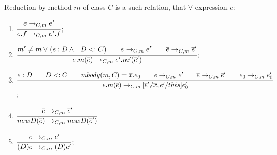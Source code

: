\documentclass[a4paper,12pt, titlepage]{article}
\newenvironment{definition}[1][Definition]{\begin{trivlist}
\item[\hskip \labelsep {\bfseries #1}]}{\end{trivlist}}
\begin{document}
\begin{definition}
Reduction by method $m$ of class $C$ is a such relation, that $\forall$ expression $e$:
\begin{enumerate}
\item $\cfrac{e \rightarrow_{C, m} e'}{e.f \rightarrow_{C, m} e'.f}$;
\item $\cfrac{m' \ne m \lor (e : D \land \lnot D <: C) \qquad e \rightarrow_{C, m} e' \qquad \overline{e} \rightarrow_{C, m} \overline{e}'}
{e.m(\overline{e}) \rightarrow_{C, m} e'.m'(\overline{e}')}$;
\item $\cfrac{e : D \qquad D <: C \qquad mbody(m, C) = \overline{x}.e_0 \qquad e \rightarrow_{C, m} e' \qquad \overline{e} \rightarrow_{C, m} \overline{e}' \qquad e_0 \rightarrow_{C, m} e_0'}
{e.m(\overline{e}) \rightarrow_{C, m} [\overline{e}' / \overline{x}, e' / this]e_0'}$;
\item $\cfrac{\overline{e} \rightarrow_{C, m} \overline{e}'}{new D(\overline{e}) \rightarrow_{C, m} new D(\overline{e}')}$
\item $\cfrac{e \rightarrow_{C, m} e'}{(D)e \rightarrow_{C, m} (D)e'}$;
\end{enumerate}
\end{definition}
\end{document}
